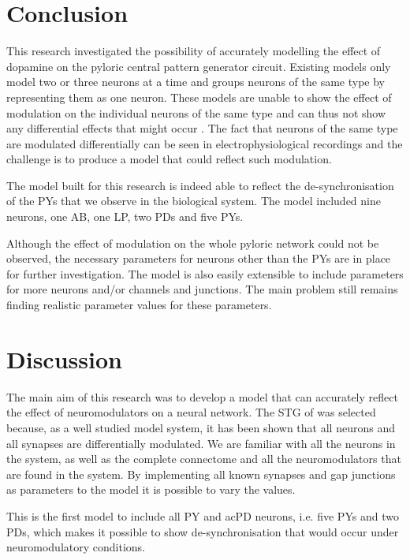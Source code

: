 \section{Conclusion}
This research investigated the possibility of accurately modelling the effect of dopamine on the pyloric central pattern generator circuit. Existing models only model two or three neurons at a time and groups neurons of the same type by representing them as one neuron. These models are unable to show the effect of modulation on the individual neurons of the same type and can thus not show any differential effects that might occur \cite{Soto-Trevino2005, Golowasch1999a}. The fact that neurons of the same type are modulated differentially can be seen in electrophysiological recordings and the challenge is to produce a model that could reflect such modulation.



The model built for this research is indeed able to reflect the de-synchronisation of the \acp{PY} that we observe in the biological system. The model included nine neurons, one \ac{AB}, one \ac{LP}, two \acp{PD} and five \acp{PY}. 

Although the effect of modulation on the whole pyloric network could not be observed, the necessary parameters for neurons other than the \acp{PY} are in place for further investigation. The model is also easily extensible to include parameters for more neurons and/or channels and junctions. The main problem still remains finding realistic parameter values for these parameters. 


\section{Discussion}
The main aim of this research was to develop a model that can accurately reflect the effect of neuromodulators on a neural network. The \ac{STG} of  was selected because, as a well studied model system, it has been shown that all neurons and all synapses are differentially modulated. We are familiar with all the neurons in the system, as well as the complete connectome and all the neuromodulators that are found in the system. By implementing all known synapses and gap junctions as parameters to the model it is possible to vary the values. 

This is the first model to include all \ac{PY} and ac{PD} neurons, i.e. five \acp{PY} and two \acp{PD}, which makes it possible to show de-synchronisation that would occur under neuromodulatory conditions. 

